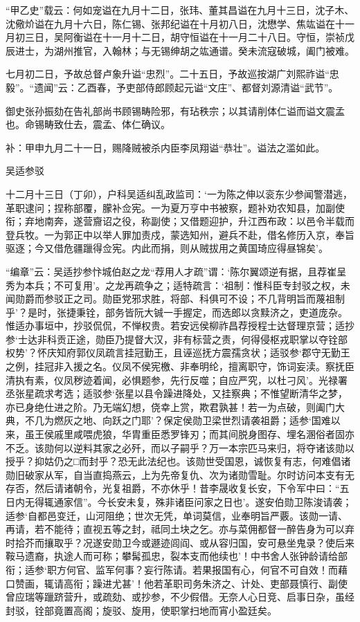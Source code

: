 \documentclass[]{article}
\begin{document}
``甲乙史''载云：何如宠谥在九月十二日，张玮、董其昌谥在九月十三日，沈子木、沈儆炌谥在九月十六日，陈仁锡、张邦纪谥在十月初八日，沈懋学、焦竑谥在十一月初三日，吴阿衡谥在十一月十二日，胡守恒谥在十一月二十八日。守恒，崇祯戊辰进士，为湖州推官，入翰林；与无锡绅胡之竑通谱。癸未流寇破城，阖门被难。

七月初二日，予故总督卢象升谥``忠烈''。二十五日，予故巡按湖广刘熙祚谥``忠毅''。``遗闻''云：乙酉春，予吏部侍郎顾起元谥``文庄''、都督刘源清谥``武节''。

御史张孙振劾在告礼部尚书顾锡畴险邪，有玷秩宗；以其请削体仁谥而谥文震孟也。命锡畴致仕去，震孟、体仁确议。

补：甲申九月二十一日，赐降贼被杀内臣李凤翔谥``恭壮''。谥法之滥如此。

吴适参驳

十二月十三日（丁卯），户科吴适纠乱政监司：`一为陈之伸以衮东少参闻警潜逃，革职逮问；捏称部覆，朦补佥宪。一为夏万亨中书被察，题补劝农知县，加副使衔；弃地南奔，遂营齎诏之役，称副使；又借题迎护，升江西布政：以邑令半载而登兵牧。一为郭正中以举人罪加责戍，蒙选知州，避兵不赴，借名修历入京，奉旨驱逐；今又借危疆躐得佥宪。内此而捐，则从贼拔用之黄国琦应得昼锦矣'。

``编章''云：吴适抄参忭城伯赵之龙``荐用人才疏''谓：`陈尔翼颂逆有据，且荐崔呈秀为本兵；不可复用'。之龙再疏争之；适特疏言：`祖制：惟科臣专封驳之权，未闻勋爵而参驳正之司。勋臣党邪求胜，将部、科俱可不设；不几背明旨而蔑祖制乎'？是时，张捷秉铨，部务皆阮大铖一手握定，而选郎以贪黩济之，吏道庞杂。惟适办事垣中，抄驳侃侃，不惮权贵。若安远侯柳祚昌荐授程士达督理京营；适抄参`士达非科贡正途，勋臣乃提督大汉，非有标营之责，何得侵枢戎职掌以夺铨部权势'？怀庆知府郭仪凤疏言挂冠勤王，且诬巡抚方震孺贪状；适驳参`郡守无勤王之例，挂冠非入援之名。仪凤不侯宪檄、非奉明纶，擅离职守，饰词妄渎。察抚臣清执有素，仪凤秽迹着闻，必惧题参，先行反噬；自应严究，以杜刁风'。光禄署丞张星疏求考选；适驳参`张星以县令躁进降处，又挂察典；不惟望断清华之梦，亦已身绝仕进之阶。乃无端幻想，侥幸上赏，欺君孰甚！若一为点破，则阖门大典，不几为燃灰之地、向跃之门耶'？保定侯勋卫梁世烈请袭祖爵；适参`国难以来，虽王侯戚里咸喂虎狼，华胄重臣悉罗锋刃；而其间脱身图存、埋名溷俗者固亦不乏。该勋何以逆料其家之必歼，而以子嗣乎？万一本宗匹马来归，将夺诸该勋以授乎？抑姑仍之□而封乎？恐无此法纪也。该勋世受国恩，诚恢复有志，何难倡诸勋旧破家从军，自当直捣燕云，上为先帝复仇、次为诸勋雪耻。尔时访问本支有无存否，然后请诸朝令，光复祖爵，不亦休乎！昔李晟收复长安，下令军中曰：``五日内无得辄通家信''。今长安未复，殊非诸臣问家之日也'。遂安伯勋卫陈浚请袭；适参`自都邑变迁，山河阻绝；世次无凭，单词莫信，业奉明旨严覈。该勋一请、再请，若不能待；直视五等之封，祗同土块之乞。亦与菜佣都督一醉告身为可以弃时拾芥而攘取乎？况遂安勋卫今或遯迹闾阎、或从容归国，安可悬坐鬼录？使后来鞍马遗裔，执途人而可称；攀髯孤忠，裂本支而他续也'！中书舍人张钟龄请给部衔；适参`职方何官、监军何事？妄行陈请。若果报国有心，何官不可自效！而藉口赞画，辄请高衔；躁进尤甚'！他若革职司务朱济之、计处、吏部聂慎行、副使曾应瑞等躐跻营升，或疏劾、或抄参，不少假借。无奈人心日竞、启事日杂，虽经封驳，铨部竟置高阁；旋驳、旋用，使职掌扫地而宵小盈廷矣。
\end{document}
